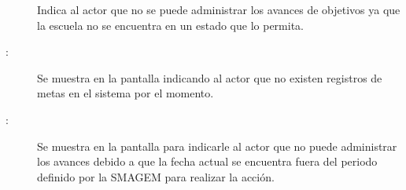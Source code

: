     \begin{description}
    \item[] Indica al actor que no se puede administrar los avances de objetivos ya que la escuela no se encuentra en un estado que lo permita.

	\item [:] Se muestra en la pantalla  indicando al actor que no existen registros de metas en el sistema por el momento.
	
	\item [:] Se muestra en la pantalla  para indicarle al actor que no puede administrar los avances debido a que la fecha actual se encuentra fuera del periodo definido por la SMAGEM para realizar la acción.
    \end{description}
